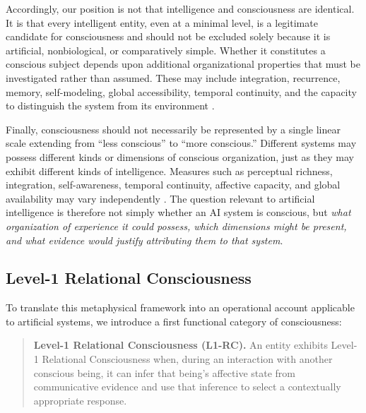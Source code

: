 Accordingly, our position is not that intelligence and consciousness are
identical. It is that every intelligent entity, even at a minimal level, is a
legitimate candidate for consciousness and should not be excluded solely because
it is artificial, nonbiological, or comparatively simple. Whether it constitutes
a conscious subject depends upon additional organizational properties that must be
investigated rather than assumed. These may include integration, recurrence,
memory, self-modeling, global accessibility, temporal continuity, and the capacity
to distinguish the system from its environment
\cite{baars1988cognitive,tononi2004information,dehaene2011experimental,lamme2006towards,butlin2023consciousness}.

Finally, consciousness should not necessarily be represented by a single linear
scale extending from ``less conscious'' to ``more conscious.'' Different systems
may possess different kinds or dimensions of conscious organization, just as they
may exhibit different kinds of intelligence. Measures such as perceptual richness,
integration, self-awareness, temporal continuity, affective capacity, and global
availability may vary independently \cite{bayne2016levels,birch2020dimensions}.
The question relevant to artificial intelligence is therefore not simply whether
an AI system is conscious, but \emph{what organization of experience it could
possess, which dimensions might be present, and what evidence would justify
attributing them to that system}.

\subsection{Level-1 Relational Consciousness}
\label{subsec:level-one-relational-consciousness}

To translate this metaphysical framework into an operational account applicable
to artificial systems, we introduce a first functional category of consciousness:

\begin{quote}
\textbf{Level-1 Relational Consciousness (L1-RC).} An entity exhibits Level-1
Relational Consciousness when, during an interaction with another conscious being,
it can infer that being's affective state from communicative evidence and use that
inference to select a contextually appropriate response.
\end{quote}


